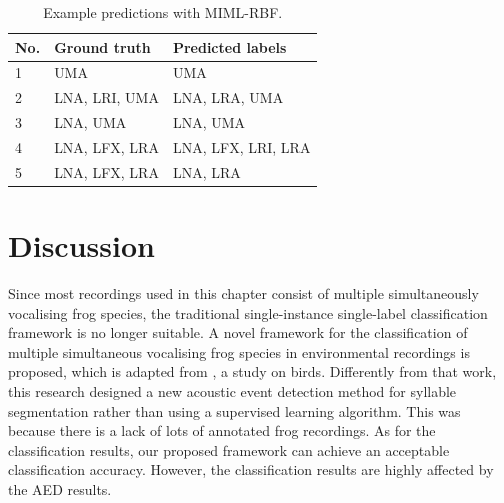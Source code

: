 \begin{table}[htb!]
\centering
\caption{Example predictions with MIML-RBF.}
\label{tab:prediction}
\begin{tabular}{lll}
\hline\hline
{\bf No.} &{\bf Ground truth} & {\bf Predicted labels} \\ \hline
1&UMA                & UMA                    \\ 
2&LNA, LRI, UMA      & LNA, LRA, UMA          \\ 
3&LNA, UMA           & LNA, UMA               \\ 
4&LNA, LFX, LRA      & LNA, LFX, LRI, LRA     \\ 
5&LNA, LFX, LRA      & LNA, LRA               \\ \hline\hline
\end{tabular}
\end{table}



\section{Discussion}
Since most recordings used in this chapter consist of multiple simultaneously vocalising frog species, the traditional single-instance single-label classification framework is no longer suitable. A novel framework for the classification of multiple simultaneous vocalising frog species in environmental recordings is proposed, which is adapted from \cite{briggs2012acoustic}, a study on birds. Differently from that work, this research designed a new acoustic event detection method for syllable segmentation rather than using a supervised learning algorithm. This was because there is a lack of lots of annotated frog recordings. As for the classification results, our proposed framework can achieve an acceptable classification accuracy. However, the classification results are highly affected by the AED results. 


